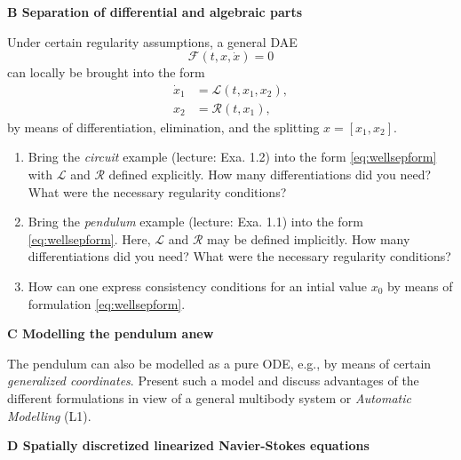\documentclass[a4paper,10pt]{article}
\begin{document}
{\bf B Separation of differential and algebraic parts}

Under certain regularity assumptions, a general DAE
\begin{equation*}
	\mathcal F(t, x, \dot x) = 0
\end{equation*}
can locally be brought into the form 
\begin{subequations}\label{eq:wellsepform}
	\begin{align}
		\dot x_1 &= \mathcal L(t, x_1, x_2), \\
		x_2 &= \mathcal R(t, x_1),
	\end{align}
\end{subequations}
by means of differentiation, elimination, and the splitting $x=[x_1,x_2]$.
\begin{enumerate}
	\item Bring the \emph{circuit} example (lecture: Exa. 1.2) into the form \eqref{eq:wellsepform} with $\mathcal L$ and $\mathcal R$ defined explicitly. How many differentiations did you need? What were the necessary regularity conditions?
	\item Bring the \emph{pendulum} example (lecture: Exa. 1.1) into the form \eqref{eq:wellsepform}. Here, $\mathcal L$ and $\mathcal R$ may be defined implicitly. How many differentiations did you need? What were the necessary regularity conditions?
	\item How can one express consistency conditions for an intial value $x_0$ by means of formulation \eqref{eq:wellsepform}.
\end{enumerate}

\bigskip

{\bf C Modelling the pendulum anew}

The pendulum can also be modelled as a pure ODE, e.g., by means of certain \emph{generalized coordinates}. Present such a model and discuss advantages of the different formulations in view of a general multibody system or \emph{Automatic Modelling} (L1).
\bigskip

{\bf D Spatially discretized linearized Navier-Stokes equations}
\end{document}
